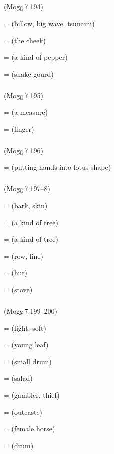 \subparagraph*{} (Mogg\,7.194)\label{pacckx:ola}

 =  (billow, big wave, tsunami)\par
{} =  (the cheek)\par
{} =  (a kind of pepper)\par
{} =  (snake-gourd)\par

\subparagraph*{} (Mogg\,7.195)\label{pacckx:ula}\label{pacckx:uli}

 =  (a measure)\par
{} =  (finger)\par

\subparagraph*{} (Mogg\,7.196)\label{pacckx:ali}

 =  (putting hands into lotus shape)\par

\subparagraph*{} (Mogg\,7.197--8)\label{pacckx:li}

 =  (bark, skin)\par
{} =  (a kind of tree)\par
{} =  (a kind of tree)\par
{} =  (row, line)\par
{} =  (hut)\par
{} =  (stove)\par

\subparagraph*{} (Mogg\,7.199--200)\label{pacckx:ava}

 =  (light, soft)\par
{} =  (young leaf)\par
{} =  (small drum)\par
{} =  (salad)\par
{} =  (gambler, thief)\par
{} =  (outcaste)\par
{} =  (female horse)\par
{} =  (drum)\par

